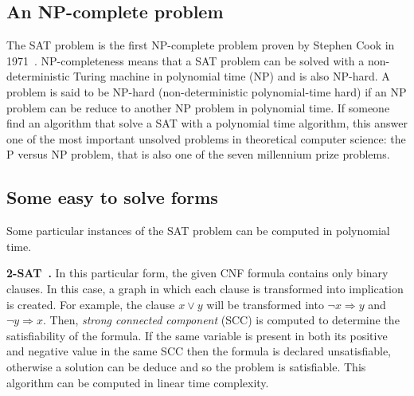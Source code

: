 \subsection{An NP-complete problem}
The SAT problem is the first NP-complete problem proven by Stephen Cook in 1971~\cite{cook1971complexity}.
NP-completeness means that a SAT problem can be solved with a non-deterministic Turing machine in polynomial time (NP) and is also NP-hard.
A problem is said to be NP-hard (non-deterministic polynomial-time hard) if an NP problem 
can be reduce to another NP problem in polynomial time.
If someone find an algorithm that solve a SAT with a polynomial time algorithm, this answer 
one of the most important unsolved problems in theoretical computer science: the P versus NP problem,
 that is also one of the seven millennium prize problems.

\subsection{Some easy to solve forms}

Some particular instances of the SAT problem can be computed in polynomial time.

\textbf{2-SAT~\cite{aspvall1979linear}.}
In this particular form, the given CNF formula contains only binary clauses.
In this case, a graph in which each clause is transformed into implication is created.
For example, the clause $x \lor y$ will be transformed into $ \neg x \Rightarrow y$ and $\neg y \Rightarrow x$.
Then, \emph{strong connected component} (SCC) is computed to determine the satisfiability of the formula.
If the same variable is present in both its positive and negative value in the same SCC then the formula is declared unsatisfiable,
otherwise a solution can be deduce and so the problem is satisfiable. 
This algorithm can be computed in linear time complexity.


